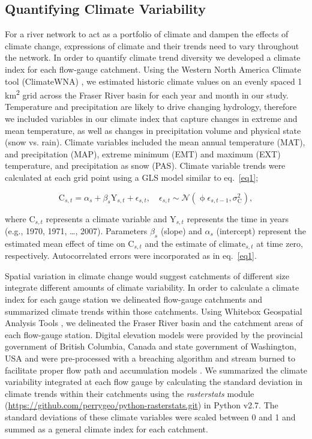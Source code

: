 \documentclass[draft,linenumbers]{AGUJournal}
\begin{document}
\subsection{Quantifying Climate Variability}

For a river network to act as a portfolio of climate and dampen the effects of climate change, expressions of climate and their trends need to vary throughout the network. In order to quantify climate trend diversity we developed a climate index for each flow-gauge catchment. Using the Western North America Climate tool (ClimateWNA) \citep{Wang:2016}, we estimated historic climate values on an evenly spaced 1 km\textsuperscript{2} grid across the Fraser River basin for each year and month in our study. Temperature and precipitation are likely to drive changing hydrology, therefore we included variables in our climate index that capture changes in extreme and mean temperature, as well as changes in precipitation volume and physical state (snow vs. rain). Climate variables included the mean annual temperature (MAT), and precipitation (MAP), extreme minimum (EMT) and maximum (EXT) temperature, and precipitation as snow (PAS). Climate variable trends were calculated at each grid point using a GLS model similar to eq.~\ref{eq1};
\begin{linenomath*}
\begin{equation}
	\mathrm{C}_{s,t} = \alpha_s + \beta_s \mathrm{Y}_{s,t} + \epsilon_{s,t}, \quad 
  \epsilon_{s,t} \sim \mathcal{N}(\upphi \epsilon_{s,t-1}, \sigma_\mathrm{C}^2) \label{eq2},
\end{equation}
\end{linenomath*}
where $\mathrm{C}_{s,t}$ represents a climate variable and $\mathrm{Y}_{s,t}$ represents the time in years (e.g., 1970, 1971, \ldots, 2007). Parameters $\beta_{s}$ (slope) and $\alpha_{s}$ (intercept) represent the estimated mean effect of time on $\mathrm{C}_{s,t}$ and the estimate of $\mathrm{climate}_{s,t}$ at time zero, respectively. Autocorrelated errors were incorporated as in eq.~\ref{eq1}.
	
	Spatial variation in climate change would suggest catchments of different size integrate different amounts of climate variability. In order to calculate a climate index for each gauge station we delineated flow-gauge catchments and summarized climate trends within those catchments. Using Whitebox Geospatial Analysis Tools \citep{Lindsay:2016}, we delineated the Fraser River basin and the catchment areas of each flow-gauge station. Digital elevation models were provided by the provincial government of British Columbia, Canada and state government of Washington, USA and were pre-processed with a breaching algorithm and stream burned to facilitate proper flow path and accumulation models \citep{Woodrow:2016}. We summarized the climate variability integrated at each flow gauge by calculating the standard deviation in climate trends within their catchments using the \textit{rasterstats} module (\url{https://github.com/perrygeo/python-rasterstats.git}) in Python v2.7. The standard deviations of these climate variables were scaled between 0 and 1 and summed as a general climate index for each catchment.
\end{document}
